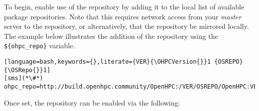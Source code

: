 To begin, enable use of the \OHPC{} repository by adding it to the local list of
available package repositories.  Note that this requires network access from
your {\em master} server to the \OHPC{} repository, or alternatively, that
the \OHPC{} repository be mirrored locally. The example below illustrates the addition
of the \OHPC{} repository using the \texttt{\$\{ohpc\_repo\}}
variable.

\begin{lstlisting}[language=bash,keywords={},literate={VER}{\OHPCVersion{}}1 {OSREPO}{\OSRepo{}}1]
[sms](*\#*) ohpc_repo=http://build.openhpc.community/OpenHPC:/VER/OSREPO/OpenHPC:VER.repo
\end{lstlisting}

Once set, the repository can be enabled via the following: 






